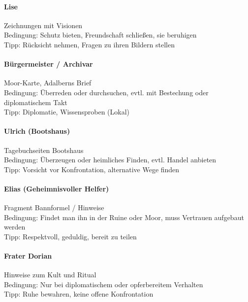 \paragraph{Lise}
Zeichnungen mit Visionen\\
Bedingung: 
Schutz bieten, Freundschaft schließen, sie beruhigen\\
Tipp: 
Rücksicht nehmen, Fragen zu ihren Bildern stellen
\paragraph{Bürgermeister / Archivar}
Moor-Karte, Adalberns Brief\\
Bedingung: 
Überreden oder durchsuchen, evtl. mit Bestechung oder diplomatischem Takt\\
Tipp: 
Diplomatie, Wissensproben (Lokal)
\paragraph{Ulrich (Bootshaus)}
Tagebuchseiten Bootshaus\\
Bedingung: 
Überzeugen oder heimliches Finden, evtl. Handel anbieten\\
Tipp: 
Vorsicht vor Konfrontation, alternative Wege finden
\paragraph{Elias (Geheimnisvoller Helfer)}
Fragment Bannformel / Hinweise\\
Bedingung: 
Findet man ihn in der Ruine oder Moor, muss Vertrauen aufgebaut werden\\
Tipp: 
Respektvoll, geduldig, bereit zu teilen
\paragraph{Frater Dorian}
Hinweise zum Kult und Ritual\\
Bedingung: 
Nur bei diplomatischem oder opferbereitem Verhalten\\
Tipp: 
Ruhe bewahren, keine offene Konfrontation

